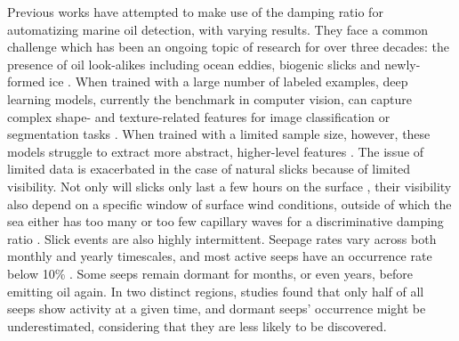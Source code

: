 \documentclass[lettersize,journal]{IEEEtran}
\begin{document}
Previous works have attempted to make use of the damping ratio for automatizing marine oil detection, with varying results. They face a common challenge which has been an ongoing topic of research for over three decades: 
the presence of oil look-alikes including ocean eddies, biogenic slicks and newly-formed ice \cite{johanssonCanMineralOil2020,hovlandSlickDetectionSAR1994,alpersOilsSurfactants2004,alpersOilSpillDetection2017}. 
When trained with a large number of labeled examples, deep learning models, currently the benchmark in computer vision, can capture complex shape- and texture-related features for image classification or segmentation tasks 
\cite{goodfellowDeepLearning2016}. When trained with a limited sample size, however, these models struggle to extract more abstract, higher-level features
\cite{bengioDeepLearningRepresentations2012}. The issue of limited data is exacerbated in the case of natural slicks because of limited visibility. Not only will slicks only last a few hours on the surface 
\cite{jatiaultMonitoringNaturalOil2017,daneshgaraslHindcastModelingOil2017,oreillyDistributionMagnitudeVariability2022}, their visibility also depend on a specific window of surface wind conditions, outside of which the sea 
either has too many or too few capillary waves for a discriminative damping ratio \cite{quigleyInvestigationDampingRatio2023,sausDetectionDelineationProduced2021,gadeImagingBiogenicAnthropogenic1998}. 
\IEEEpubidadjcol  
Slick events are also highly intermittent. Seepage rates vary across both monthly and yearly timescales, and most active seeps have an occurrence rate below 10\% 
\cite{jatiaultNaturalOilSeep2024,oreillyDistributionMagnitudeVariability2022}. Some seeps remain dormant for months, or even years, before emitting oil again. In two distinct regions, studies found that 
only half of all seeps show activity at a given time\cite{jatiaultMonitoringNaturalOil2017,garcia-pinedaRemotesensingEvaluationGeophysical2010}, and dormant seeps' occurrence might be underestimated, 
considering that they are less likely to be discovered.
\end{document}
